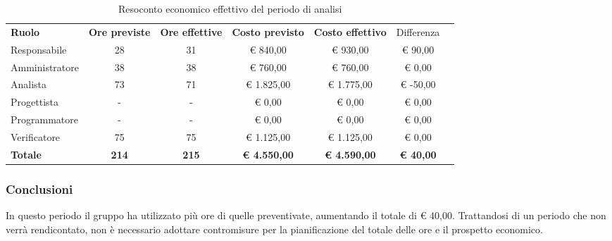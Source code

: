 \documentclass[../piano-di-progetto.tex]{subfiles}
\begin{document}
  \begin{table}[H]
    \centering
    \begin{tabular}{lcccccc}
      \rowcolor{lightgray}
      \textbf{Ruolo}  & \textbf{Ore previste} & \textbf{Ore effettive} & \textbf{Costo previsto} & \textbf{Costo effettivo} & Differenza \\
      Responsabile    & 28                    & 31                     & € 840,00                & € 930,00                 & € 90,00    \\
      Amministratore  & 38                    & 38                     & € 760,00                & € 760,00                 & € 0,00     \\
      Analista        & 73                    & 71                     & € 1.825,00              & € 1.775,00               & € -50,00   \\
      Progettista     & -                     & -                      & € 0,00                  & € 0,00                   & € 0,00     \\
      Programmatore   & -                     & -                      & € 0,00                  & € 0,00                   & € 0,00     \\
      Verificatore    & 75                    & 75                     & € 1.125,00              & € 1.125,00               & € 0,00     \\
      \textbf{Totale} & \textbf{214}          & \textbf{215}           & \textbf{€ 4.550,00}     & \textbf{€ 4.590,00}      & \textbf{€ 40,00}   
      
    \end{tabular}
    \caption{Resoconto economico effettivo del periodo di analisi}
  \end{table}


\subsubsection{Conclusioni}
In questo periodo il gruppo ha utilizzato più ore di quelle preventivate, aumentando il totale di € 40,00. Trattandosi di un periodo che non verrà rendicontato, non è necessario adottare contromisure per la pianificazione del totale delle ore e il prospetto economico.
\end{document}
